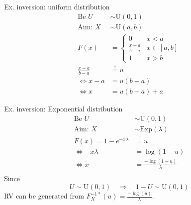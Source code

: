 \documentclass[11pt,compress,t,notes=noshow, xcolor=table]{beamer}
\begin{document}
\begin{vbframe}{Ex. inversion: uniform distribution}
\begin{align*}
\text{Be } U&\sim \text{U}(0,1)\\
\text{Aim: } X&\sim \text{U}(a,b)\\
F(x) &=
\begin{cases}
0 & x < a\\
\frac{x-a}{b-a} &x\in [a,b]\\
1 & x > b
\end{cases}\\
\frac{x-a}{b-a} &\overset{!}{=} u\\
\Leftrightarrow x-a &= u(b-a)\\
\Leftrightarrow x &= u(b-a)+a
\end{align*}
\end{vbframe}


\begin{vbframe}{Ex. inversion: Exponential distribution}
\begin{align*}
\text{Be } U&\sim \text{U}(0,1)\\
\text{Aim: } X&\sim\mathrm{Exp}(\lambda)\\
F(x) = 1-e^{-x\lambda} &\overset{!}{=} u\\
\Leftrightarrow -x\lambda &= \log(1-u)\\
\Leftrightarrow x &= \frac{-\log(1-u)}\lambda\\
\end{align*}
Since
$$
  U \sim \text{U}(0,1) \quad\Rightarrow\quad 1-U \sim \text{U}(0,1)
$$
RV can be generated from $F_X^{-1*}(u)=\frac{-\log(u)}\lambda$.
\end{vbframe}


%
%
\end{document}

